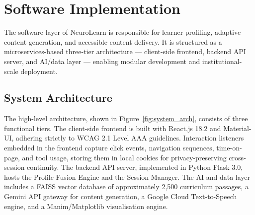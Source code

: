 \section{Software Implementation}

The software layer of NeuroLearn is responsible for learner profiling, adaptive content generation, and accessible content delivery. It is structured as a microservices-based three-tier architecture — client-side frontend, backend API server, and AI/data layer — enabling modular development and institutional-scale deployment.

\subsection{System Architecture}

The high-level architecture, shown in Figure~\ref{fig:system_arch}, consists of three functional tiers. The client-side frontend is built with React.js 18.2 and Material-UI, adhering strictly to WCAG 2.1 Level AAA guidelines. Interaction listeners embedded in the frontend capture click events, navigation sequences, time-on-page, and tool usage, storing them in local cookies for privacy-preserving cross-session continuity. The backend API server, implemented in Python Flask 3.0, hosts the Profile Fusion Engine and the Session Manager. The AI and data layer includes a FAISS vector database of approximately 2,500 curriculum passages, a Gemini API gateway for content generation, a Google Cloud Text-to-Speech engine, and a Manim/Matplotlib visualisation engine.

